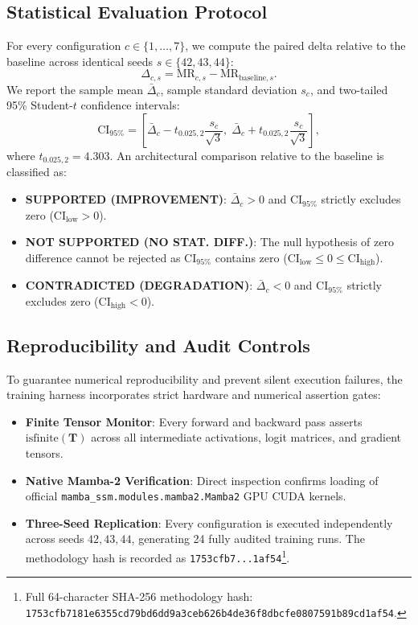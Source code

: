 \documentclass[10pt,journal,final]{IEEEtran}
\begin{document}
\subsection{Statistical Evaluation Protocol}
For every configuration $c \in \{1, \dots, 7\}$, we compute the paired delta relative to the baseline across identical seeds $s \in \{42, 43, 44\}$:
\begin{equation}
\label{eq:paired_delta}
\Delta_{c, s} = \mathrm{MR}_{c, s} - \mathrm{MR}_{\mathrm{baseline}, s}.
\end{equation}
We report the sample mean $\bar{\Delta}_c$, sample standard deviation $s_c$, and two-tailed 95\% Student-$t$ confidence intervals:
\begin{equation}
\label{eq:confidence_interval}
\mathrm{CI}_{95\%} = \left[ \bar{\Delta}_c - t_{0.025, 2} \frac{s_c}{\sqrt{3}}, \; \bar{\Delta}_c + t_{0.025, 2} \frac{s_c}{\sqrt{3}} \right],
\end{equation}
where $t_{0.025, 2} = 4.303$. An architectural comparison relative to the baseline is classified as:
\begin{itemize}
    \item \textbf{SUPPORTED (IMPROVEMENT)}: $\bar{\Delta}_c > 0$ and $\mathrm{CI}_{95\%}$ strictly excludes zero ($\mathrm{CI}_{\mathrm{low}} > 0$).
    \item \textbf{NOT SUPPORTED (NO STAT. DIFF.)}: The null hypothesis of zero difference cannot be rejected as $\mathrm{CI}_{95\%}$ contains zero ($\mathrm{CI}_{\mathrm{low}} \le 0 \le \mathrm{CI}_{\mathrm{high}}$).
    \item \textbf{CONTRADICTED (DEGRADATION)}: $\bar{\Delta}_c < 0$ and $\mathrm{CI}_{95\%}$ strictly excludes zero ($\mathrm{CI}_{\mathrm{high}} < 0$).
\end{itemize}

\subsection{Reproducibility and Audit Controls}
To guarantee numerical reproducibility and prevent silent execution failures, the training harness incorporates strict hardware and numerical assertion gates:
\begin{itemize}
    \item \textbf{Finite Tensor Monitor}: Every forward and backward pass asserts $\mathrm{isfinite}(\mathbf{T})$ across all intermediate activations, logit matrices, and gradient tensors.
    \item \textbf{Native Mamba-2 Verification}: Direct inspection confirms loading of official \texttt{mamba\_ssm.modules.mamba2.Mamba2} GPU CUDA kernels.
    \item \textbf{Three-Seed Replication}: Every configuration is executed independently across seeds $42, 43, 44$, generating 24 fully audited training runs. The methodology hash is recorded as \texttt{1753cfb7...1af54}\footnote{Full 64-character SHA-256 methodology hash: \texttt{1753cfb7181e6355cd79bd6dd9a3ceb6}\allowbreak\texttt{26b4de36f8dbcfe0807591b89cd1af54}.}.
\end{itemize}
\end{document}
